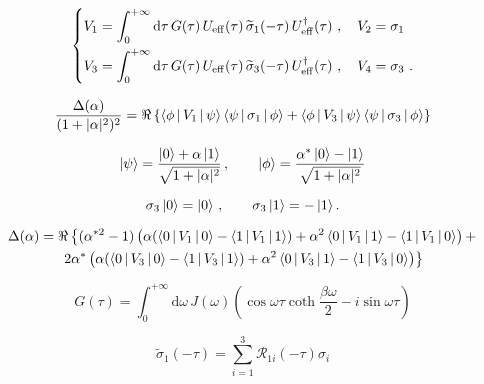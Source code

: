 \documentclass{article}
\begin{document}
\begin{equation}
  \left\{
    \begin{aligned}
      V_1 &= \int_0^{+\infty}{\rm d}\tau\, G(\tau)\, U_{\mathrm{eff}}(\tau)\,
      \widetilde{\sigma}_1(-\tau)\, U^\dag_{\mathrm{eff}}(\tau)\ ,\quad V_2=\sigma_1
      \\  
      V_3 &= \int_0^{+\infty}{\rm d}\tau\, G(\tau)\, U_{\mathrm{eff}}(\tau)\,
      \widetilde{\sigma}_3(-\tau)\, U^\dag_{\mathrm{eff}}(\tau)\ ,\quad
      V_4=\sigma_3\ .  
    \end{aligned}
  \right.
\end{equation}

\begin{equation}
  \frac{\Delta(\alpha)}{(1+\vert \alpha \vert ^2)^2} = \Re \left\{
    \Braket{\phi|V_1|\psi} \Braket{\psi|\sigma_1|\phi} + \Braket{\phi|V_3|\psi}
    \Braket{\psi|\sigma_3|\phi} \right\} 
\end{equation}

\begin{equation}
  \Ket{\psi} = \frac{\Ket{0} + \alpha\Ket{1}}{\sqrt{1+\vert\alpha\vert^2}} \, ,
  \qquad \Ket{\phi} =
  \frac{\alpha^\ast\Ket{0}-\Ket{1}}{\sqrt{1+\vert\alpha\vert^2}} 
\end{equation}

\begin{equation}
  \sigma_3 \Ket{0} = \Ket{0} \, , \qquad \sigma_3 \Ket{1} = - \Ket{1} .
\end{equation}

\begin{multline}
  \Delta(\alpha) = \Re \left\{ (\alpha^{\ast 2} -1) \left( \alpha
      (\Braket{0|V_1|0} - \Braket{1|V_1|1}) + \alpha^2 \Braket{0|V_1|1} -
      \Braket{1|V_1|0} \right) + \right. \\ 
  \left.  2 \alpha^\ast \left( \alpha (\Braket{0|V_3|0} - \Braket{1|V_3|1}) +
      \alpha^2 \Braket{0|V_3|1} - \Braket{1|V_3|0} \right) \right\} 
\end{multline}

\begin{equation}
  G(\tau) = \int_0^{+\infty}\mathrm{d}\omega\, J(\omega) \left( \cos\omega\tau
  \coth\frac{\beta\omega}{2} - i \sin\omega\tau \right) 
\end{equation}

\begin{equation}
  \widetilde{\sigma}_1(-\tau) = \sum_{i=1}^3 \mathcal{R}_{1i}(-\tau)\sigma_i
\end{equation}
\end{document}
